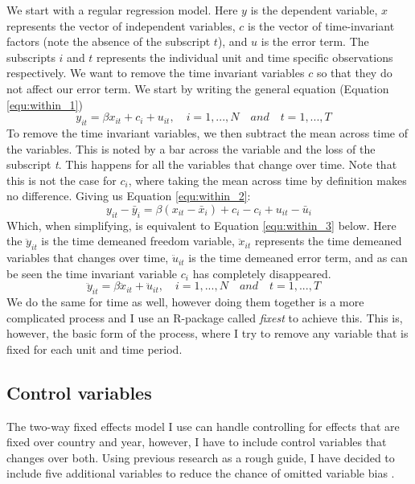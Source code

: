 We start with a regular regression model. Here $y$ is the dependent variable, $x$ represents the vector of independent variables, $c$ is the vector of time-invariant factors (note the absence of the subscript $t$), and $u$ is the error term. The subscripts $i$ and $t$ represents the individual unit and time specific observations respectively. We want to remove the time invariant variables $c$ so that they do not affect our error term. We start by writing the general equation (Equation \ref{equ:within_1})
\begin{equation}
    y_{it} = \beta x_{it} + c_i + u_{it}, \quad i = 1,..., N \quad and \quad  t = 1,..., T  \quad
\label{equ:within_1}
\end{equation} 
To remove the time invariant variables, we then subtract the mean across time of the variables. This is noted by a bar across the variable and the loss of the subscript \textit{t}. This happens for all the variables that change over time. Note that this is not the case for $c_i$, where taking the mean across time by definition makes no difference. Giving us Equation \ref{equ:within_2}:
\begin{equation}
    y_{it} - \bar{y}_i = \beta (x_{it} - \bar{x}_i) + c_i - c_i + u_{it} - \bar{u}_i
\label{equ:within_2}
\end{equation}
Which, when simplifying, is equivalent to Equation \ref{equ:within_3} below. Here the $\ddot{y}_{it}$ is the time demeaned freedom variable, $\ddot{x}_{it}$ represents the time demeaned variables that changes over time, $\ddot{u}_{it}$ is the time demeaned error term, and as can be seen the time invariant variable $c_i$ has completely disappeared. 
\begin{equation}
    \ddot{y}_{it} = \beta \ddot{x}_{it} + \ddot{u}_{it}, \quad i = 1,..., N \quad and \quad  t = 1,..., T  \quad 
\label{equ:within_3}
\end{equation}
We do the same for time as well, however doing them together is a more complicated process and I use an R-package called \textit{fixest} \citep{berge_efficient_2018} to achieve this. This is, however, the basic form of the process, where I try to remove any variable that is fixed for each unit and time period.

\subsection{Control variables} \label{control}
The two-way fixed effects model I use can handle controlling for effects that are fixed over country and year, however, I have to include control variables that changes over both. Using previous research \citep{gamso_is_2021, toettoe_foreign_2023} as a rough guide, I have decided to include five additional variables to reduce the chance of omitted variable bias \citep[pp. 81-85]{wooldridge_econometric_2010}.

